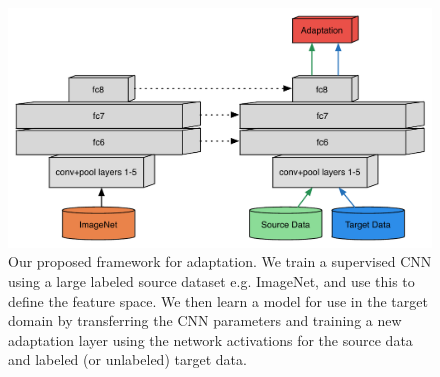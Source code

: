 \newcommand{\svmT}{\bm{\theta}}
\newcommand{\svmB}{b}
\newcommand{\svmAug}{\tilde{\svmT}}
\newcommand{\svmAugAll}{\bm{\Theta}}


\begin{figure}
\begin{center}
\includegraphics[width=.6\linewidth]{figs/model-adapt}
\end{center}
\caption{Our proposed framework for adaptation. We train a supervised CNN using a large labeled source dataset e.g. ImageNet, and use this to define the feature space. We then learn a model for use in the target domain by transferring the CNN parameters and training a new adaptation layer using the network activations for the source data and labeled (or unlabeled) target data.}
\label{fig:model-adapt}
\end{figure}


